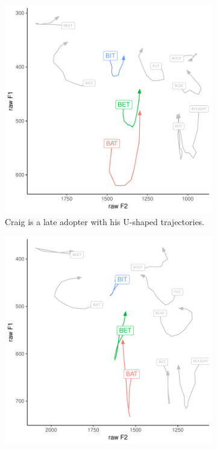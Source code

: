 \begin{figure}[tb!]
    \centering
    \hspace{\fill}
    \begin{subfigure}[t]{2.925in}
        \centering
        \includegraphics[width = \textwidth]{Figures/example_plots/35-Craig_avg_traj.pdf}
        \caption{Craig is a late adopter with his U-shaped trajectories.}
        \label{fig:avg_traj_craig}
    \end{subfigure}
    \hspace{\fill}
    \begin{subfigure}[t]{2.925in}
        \centering
        \includegraphics[width = \textwidth]{Figures/example_plots/47-Sean_avg_traj.pdf}

\end{subfigure}
\end{figure}

